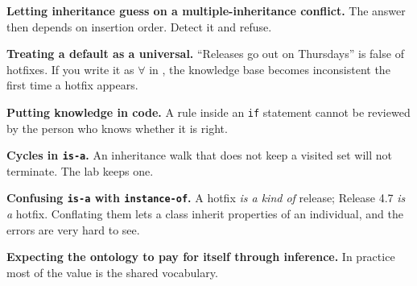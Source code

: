 \begin{pitfall}
\begin{tight}
  \item \textbf{Letting inheritance guess on a multiple-inheritance conflict.} The
        answer then depends on insertion order. Detect it and refuse.
  \item \textbf{Treating a default as a universal.} ``Releases go out on Thursdays''
        is false of hotfixes. If you write it as $\forall$ in , the
        knowledge base becomes inconsistent the first time a hotfix appears.
  \item \textbf{Putting knowledge in code.} A rule inside an \texttt{if} statement
        cannot be reviewed by the person who knows whether it is right.
  \item \textbf{Cycles in \texttt{is-a}.} An inheritance walk that does not keep a
        visited set will not terminate. The lab keeps one.
  \item \textbf{Confusing \texttt{is-a} with \texttt{instance-of}.} A hotfix
        \emph{is a kind of} release; Release 4.7 \emph{is a} hotfix. Conflating
        them lets a class inherit properties of an individual, and the errors are
        very hard to see.
  \item \textbf{Expecting the ontology to pay for itself through inference.} In
        practice most of the value is the shared vocabulary.
\end{tight}
\end{pitfall}


